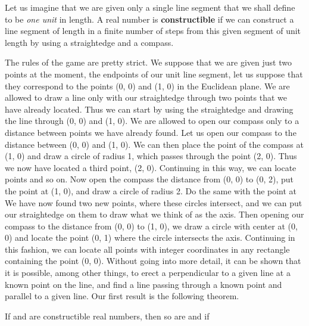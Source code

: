 \documentclass[11pt,oneside]{article}
\begin{document}
\begin{BookBody}


\noindent Let us imagine that we are given only a single line segment that we shall define to be \textit{one unit} in length. A real number \BookInline{\alpha } is\textbf{ constructible} if we can construct a line segment of length \BookInline{|\alpha |} in a finite number of steps from this given segment of unit length by using a straightedge and a compass.

The rules of the game are pretty strict. We suppose that we are given just two points at the moment, the endpoints of our unit line segment, let us suppose that they correspond to the points (0, 0) and (1, 0) in the Euclidean plane. We are allowed to draw a line only with our straightedge through two points that we have already located. Thus we can start by using the straightedge and drawing the line through (0, 0) and (1, 0). We are allowed to open our compass only to a distance between points we have already found. Let us open our compass to the distance between (0, 0) and (1, 0). We can then place the point of the compass at (1, 0) and draw a circle of radius 1, which passes through the point (2, 0). Thus we now have located a third point, (2, 0). Continuing in this way, we can locate points  and so on. Now open the compass the distance from (0, 0) to (0, 2), put the point at (1, 0), and draw a circle of radius 2. Do the same with the point at  We have now found two new points, where these circles intersect, and we can put our straightedge on them to draw what we think of as the axis. Then opening our compass to the distance from (0, 0) to (1, 0), we draw a circle with center at (0, 0) and locate the point (0, 1) where the circle intersects the axis. Continuing in this fashion, we can locate all points  with integer coordinates in any rectangle containing the point (0, 0). Without going into more detail, it can be shown that it is possible, among other things, to erect a perpendicular to a given line at a known point on the line, and find a line passing through a known point and parallel to a given line. Our first result is the following theorem.

 If \BookInline{\alpha } and \BookInline{\beta } are constructible real numbers, then so are \BookInline{\alpha + \beta,\allowbreak \alpha - \beta,\allowbreak \alpha \beta,\allowbreak } and \BookInline{\alpha /\beta,\allowbreak } if 


\end{BookBody}
\end{document}
